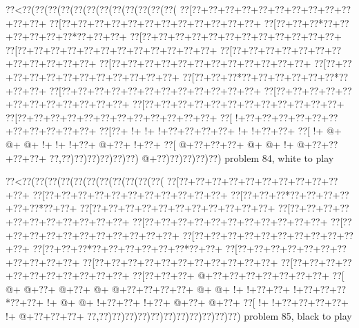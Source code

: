 \vbox{\vbox{\goo
\0??<\0??(\0??(\0??(\0??(\0??(\0??(\0??(\0??(\0??(\0??(\0??(\0??(
\0??[\0??+\0??+\0??+\0??+\0??+\0??+\0??+\0??+\0??+\0??+\0??+\0??+
\0??[\0??+\0??+\0??+\0??+\0??+\0??+\0??+\0??+\0??+\0??+\0??+\0??+
\0??[\0??+\0??+\0??*\0??+\0??+\0??+\0??+\0??+\0??*\0??+\0??+\0??+
\0??[\0??+\0??+\0??+\0??+\0??+\0??+\0??+\0??+\0??+\0??+\0??+\0??+
\0??[\0??+\0??+\0??+\0??+\0??+\0??+\0??+\0??+\0??+\0??+\0??+\0??+
\0??[\0??+\0??+\0??+\0??+\0??+\0??+\0??+\0??+\0??+\0??+\0??+\0??+
\0??[\0??+\0??+\0??+\0??+\0??+\0??+\0??+\0??+\0??+\0??+\0??+\0??+
\0??[\0??+\0??+\0??+\0??+\0??+\0??+\0??+\0??+\0??+\0??+\0??+\0??+
\0??[\0??+\0??+\0??*\0??+\0??+\0??+\0??+\0??+\0??*\0??+\0??+\0??+
\0??[\0??+\0??+\0??+\0??+\0??+\0??+\0??+\0??+\0??+\0??+\0??+\0??+
\0??[\0??+\0??+\0??+\0??+\0??+\0??+\0??+\0??+\0??+\0??+\0??+\0??+
\0??[\0??+\0??+\0??+\0??+\0??+\0??+\0??+\0??+\0??+\0??+\0??+\0??+
\0??[\0??+\0??+\0??+\0??+\0??+\0??+\0??+\0??+\0??+\0??+\0??+\0??+
\0??[\- !+\0??+\0??+\0??+\0??+\0??+\0??+\0??+\0??+\0??+\0??+\0??+
\0??[\0??+\- !+\- !+\- !+\0??+\0??+\0??+\0??+\- !+\- !+\0??+\0??+
\0??[\- !+\- @+\- @+\- @+\- !+\- !+\- !+\0??+\- @+\0??+\- !+\0??+
\0??[\- @+\0??+\0??+\0??+\- @+\- @+\- !+\- @+\0??+\0??+\0??+\0??+
\0??,\0??)\0??)\0??)\0??)\0??)\0??)\- @+\0??)\0??)\0??)\0??)\0??)
}
\hfil problem 84, white to play\hfil\break
}

\vbox{\vbox{\goo
\0??<\0??(\0??(\0??(\0??(\0??(\0??(\0??(\0??(\0??(\0??(\0??(
\0??[\0??+\0??+\0??+\0??+\0??+\0??+\0??+\0??+\0??+\0??+\0??+
\0??[\0??+\0??+\0??+\0??+\0??+\0??+\0??+\0??+\0??+\0??+\0??+
\0??[\0??+\0??+\0??*\0??+\0??+\0??+\0??+\0??+\0??*\0??+\0??+
\0??[\0??+\0??+\0??+\0??+\0??+\0??+\0??+\0??+\0??+\0??+\0??+
\0??[\0??+\0??+\0??+\0??+\0??+\0??+\0??+\0??+\0??+\0??+\0??+
\0??[\0??+\0??+\0??+\0??+\0??+\0??+\0??+\0??+\0??+\0??+\0??+
\0??[\0??+\0??+\0??+\0??+\0??+\0??+\0??+\0??+\0??+\0??+\0??+
\0??[\0??+\0??+\0??+\0??+\0??+\0??+\0??+\0??+\0??+\0??+\0??+
\0??[\0??+\0??+\0??*\0??+\0??+\0??+\0??+\0??+\0??*\0??+\0??+
\0??[\0??+\0??+\0??+\0??+\0??+\0??+\0??+\0??+\0??+\0??+\0??+
\0??[\0??+\0??+\0??+\0??+\0??+\0??+\0??+\0??+\0??+\0??+\0??+
\0??[\0??+\0??+\0??+\0??+\0??+\0??+\0??+\0??+\0??+\0??+\0??+
\0??[\0??+\0??+\0??+\- @+\0??+\0??+\0??+\0??+\0??+\0??+\0??+
\0??[\- @+\- @+\0??+\- @+\0??+\- @+\- @+\0??+\0??+\0??+\0??+
\- @+\- @+\- !+\- !+\0??+\0??+\- !+\0??+\0??+\0??*\0??+\0??+
\- !+\- @+\- @+\- !+\0??+\0??+\- !+\0??+\- @+\0??+\- @+\0??+
\0??[\- !+\- !+\0??+\0??+\0??+\0??+\- !+\- @+\0??+\0??+\0??+
\0??,\0??)\0??)\0??)\0??)\0??)\0??)\0??)\0??)\0??)\0??)\0??)
}
\hfil problem 85, black to play\hfil\break
}

